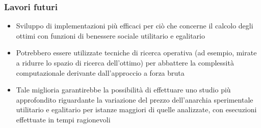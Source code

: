 \documentclass{beamer}
\begin{document}
\begin{frame}
\frametitle{Lavori futuri}
\begin{itemize}
	\item Sviluppo di implementazioni più efficaci per ciò che concerne il calcolo degli ottimi con funzioni di benessere sociale utilitario e egalitario
	\item Potrebbero essere utilizzate tecniche di ricerca operativa (ad esempio, mirate a ridurre lo spazio di ricerca dell'ottimo) per abbattere la complessità computazionale derivante dall'approccio a forza bruta
	\item Tale miglioria garantirebbe la possibilità di effettuare uno studio più approfondito riguardante la variazione del prezzo dell'anarchia sperimentale utilitario e egalitario per istanze maggiori di quelle analizzate, con esecuzioni effettuate in tempi ragionevoli
\end{itemize}
\end{frame}
\end{document}
